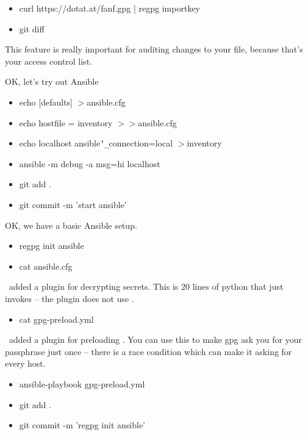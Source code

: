 {  \begin{itemize}
  \item curl https://dotat.at/fanf.gpg | regpg importkey
  \item git diff
  \end{itemize}

  This feature is really important for auditing changes to your
   file, because that's your access control list.

  OK, let's try out Ansible

  \begin{itemize}
  \item echo [defaults] $>$ansible.cfg
  \item echo hostfile = inventory $>>$ansible.cfg
  \item echo localhost ansible\texttt{\char`_}connection=local $>$inventory
  \item ansible -m debug -a msg=hi localhost
  \item git add .
  \item git commit -m 'start ansible'
  \end{itemize}

  OK, we have a basic Ansible setup.

  \begin{itemize}
  \item regpg init ansible
  \item cat ansible.cfg
  \end{itemize}

  \regpg\ added a plugin for decrypting secrets. This is 20 lines of
  python that just invokes  -- the plugin does not
  use \regpg.

  \begin{itemize}
  \item cat gpg-preload.yml
  \end{itemize}

  \regpg\ added a plugin for preloading . You can use
  this to make gpg ask you for your passphrase just once -- there is a
  race condition which can make it asking for every host.

  \begin{itemize}
  \item ansible-playbook gpg-preload.yml
  \end{itemize}

  \begin{itemize}
  \item git add .
  \item git commit -m 'regpg init ansible'
  \end{itemize}

}
